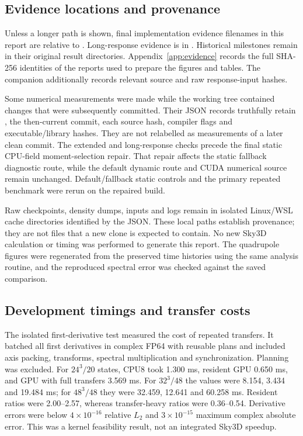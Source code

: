 \documentclass[11pt,a4paper]{article}
\newcommand{\code}[1]{\texttt{\detokenize{#1}}}
\begin{document}
\subsection{Evidence locations and provenance}
Unless a longer path is shown, final implementation evidence filenames in this
report are relative to
. Long-response evidence is in
. Historical milestones remain in their
original result directories. Appendix~\ref{app:evidence} records the full
SHA-256 identities of the reports used to prepare the figures and tables.
The companion  additionally records relevant
source and raw response-input hashes.

Some numerical measurements were made while the working tree contained changes
that were subsequently committed. Their JSON records truthfully retain
\code{source_dirty=true}, the then-current commit, each source hash, compiler
flags and executable/library hashes. They are not relabelled as measurements
of a later clean commit. The extended and long-response checks precede the
final static CPU-field moment-selection repair. That repair affects the
static fallback diagnostic route, while the default dynamic route and CUDA
numerical source remain unchanged. Default/fallback static controls and the
primary repeated benchmark were rerun on the repaired build.

Raw checkpoints, density dumps, inputs and logs remain in isolated Linux/WSL
cache directories identified by the JSON. These local paths establish
provenance; they are not files that a new clone is expected to contain. No new
Sky3D calculation or timing was performed to generate this report. The
quadrupole figures were regenerated from the preserved time histories using
the same analysis routine, and the reproduced spectral error was checked
against the saved comparison.

\subsection{Development timings and transfer costs}\label{app:history}
The isolated first-derivative test measured the cost of repeated transfers.
It batched all first derivatives in complex FP64 with reusable
plans and included axis packing, transforms, spectral multiplication and
synchronization. Planning was excluded. For $24^3/20$ states, CPU8 took
1.300 ms, resident GPU 0.650 ms, and GPU with full transfers 3.569 ms.
For $32^3/48$ the values were 8.154, 3.434 and 19.484 ms; for
$48^3/48$ they were 32.459, 12.641 and 60.258 ms. Resident ratios were
2.00--2.57, whereas transfer-heavy ratios were 0.36--0.54.
Derivative errors were below $4\times10^{-16}$ relative $L_2$ and
$3\times10^{-15}$ maximum complex absolute error. This was a kernel
feasibility result, not an integrated Sky3D speedup.
\end{document}
